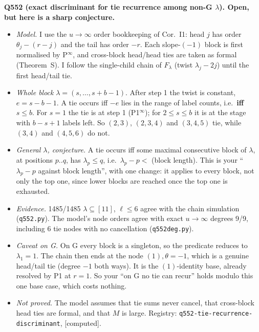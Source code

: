 \documentclass[10pt]{article}
\newcommand{\grade}[1]{\textsf{[#1]}}
\begin{document}
\textbf{Q552 (exact discriminant for tie recurrence among non-G $\lambda$). Open, but here is a sharp conjecture.}
\begin{itemize}
\item \emph{Model.} I use the $u\to\infty$ order bookkeeping of Cor.~I1: head $j$ has order $\theta_j-(r-j)$ and the tail has
order $-r$. Each slope-$(-1)$ block is first normalised by P$^\infty$, and cross-block head/head ties are taken as formal
(Theorem~S). I follow the single-child chain of $F_\lambda$ (twist $\lambda_j-2j$) until the first head/tail tie.
\item \emph{Whole block} $\lambda=(s,\dots,s+b-1)$. After step 1 the twist is constant, $e=s-b-1$. A tie occurs iff $-e$
lies in the range of label counts, i.e.\ \textbf{iff $s\le b$}. For $s=1$ the tie is at step 1 (P1$^\infty$); for
$2\le s\le b$ it is at the stage with $b-s+1$ labels left. So $(2,3)$, $(2,3,4)$ and $(3,4,5)$ tie, while $(3,4)$ and $(4,5,6)$ do not.
\item \emph{General $\lambda$, conjecture.} A tie occurs iff some maximal consecutive block of $\lambda$, at positions $p..q$,
has $\lambda_p\le q$, i.e.\ $\lambda_p-p<$ (block length). This is your ``$\lambda_p-p$ against block length'', with one change:
it applies to every block, not only the top one, since lower blocks are reached once the top one is exhausted.
\item \emph{Evidence.} 1485/1485 $\lambda\subseteq[11]$, $\ell\le6$ agree with the chain simulation (\texttt{q552.py}).
The model's node orders agree with exact $u\to\infty$ degrees 9/9, including 6 tie nodes with no cancellation (\texttt{q552deg.py}).
\item \emph{Caveat on G.} On G every block is a singleton, so the predicate reduces to $\lambda_1=1$. The chain then ends
at the node $(1),\theta=-1$, which is a genuine head/tail tie (degree $-1$ both ways). It is the $(1)$-identity base,
already resolved by P1 at $r=1$. So your ``on G no tie can recur'' holds modulo this one base case, which costs nothing.
\item \emph{Not proved.} The model assumes that tie sums never cancel, that cross-block head ties are formal, and that $M$ is large.
Registry: \texttt{q552-tie-recurrence-discriminant}, \grade{computed}.
\end{itemize}
\end{document}
